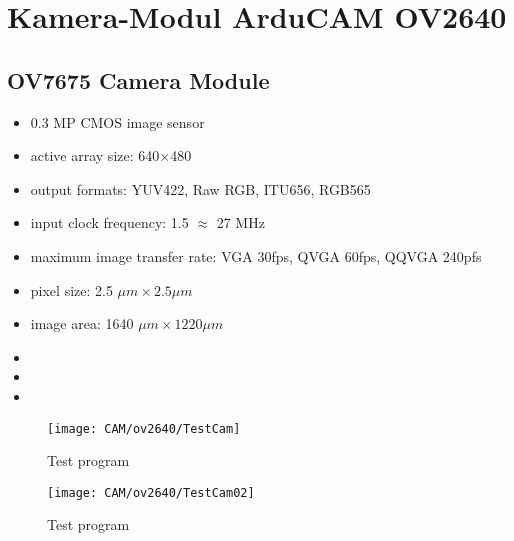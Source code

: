 %
%
%

\chapter{Kamera-Modul ArduCAM OV2640}

\section{OV7675 Camera Module}

\begin{itemize}
  \item 0.3 MP CMOS image sensor
  \item active array size: 640×480
  \item output formats: YUV422, Raw RGB, ITU656, RGB565
  \item  input clock frequency: 1.5 $\approx$ 27 MHz
  \item maximum image transfer rate: VGA 30fps, QVGA 60fps, QQVGA 240pfs
  \item pixel size: 2.5 $\mu m \times 2.5 \mu m$
  \item image area: 1640  $\mu m \times 1220  \mu m$
\end{itemize}



\begin{itemize}
    \item  {}
    \item  {}
    \item  {}
\end{itemize}



\begin{figure}
    \begin{center}
        \texttt{[image: CAM/ov2640/TestCam]}
        
        \caption{Test program}
    \end{center}    
\end{figure}

\begin{figure}
    \begin{center}
        \texttt{[image: CAM/ov2640/TestCam02]}
        
        \caption{Test program}
    \end{center}    
\end{figure}



